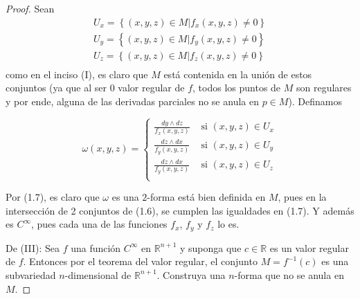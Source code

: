\documentclass[12pt]{report}
\theoremstyle{largebreak}
\begin{document}
\begin{proof}
        Sean
        \begin{equation}
            \begin{split}
                U_x=\left\{(x,y,z)\in M|f_x(x,y,z)\neq0\right\}\\
                U_y=\left\{(x,y,z)\in M|f_y(x,y,z)\neq0\right\}\\
                U_z=\left\{(x,y,z)\in M|f_z(x,y,z)\neq0\right\}\\
            \end{split}
        \end{equation}
        como en el inciso (I), es claro que $M$ está contenida en la unión de estos conjuntos (ya que al ser 0 valor regular de $f$, todos los puntos de $M$ son regulares y por ende, alguna de las derivadas parciales no se anula en $p\in M$). Definamos
        
        \begin{equation}
            \omega(x,y,z)=\left\{
                \begin{aligned}
                    \frac{dy\wedge dz}{f_x(x,y,z)} & \text{ si }(x,y,z)\in U_x\\
                    \frac{dz\wedge dx}{f_y(x,y,z)} & \text{ si }(x,y,z)\in U_y\\
                    \frac{dz\wedge dx}{f_y(x,y,z)} & \text{ si }(x,y,z)\in U_z\\
                \end{aligned}
            \right.
        \end{equation}

        Por (1.7), es claro que $\omega$ es una $2$-forma está bien definida en $M$, pues en la intersección de 2 conjuntos de (1.6), se cumplen las igualdades en (1.7). Y además es $C^\infty$, pues cada una de las funciones $f_x$, $f_y$ y $f_z$ lo es.

        De (III): Sea $f$ una función $C^\infty$ en $\mathbb{R}^{n+1}$ y suponga que $c\in\mathbb{R}$ es un valor regular de $f$. Entonces por el teorema del valor regular, el conjunto $M=f^{-1}(c)$ es una subvariedad $n$-dimensional de $\mathbb{R}^{n+1}$. Construya una $n$-forma que no se anula en $M$.


\end{proof}
\end{document}
